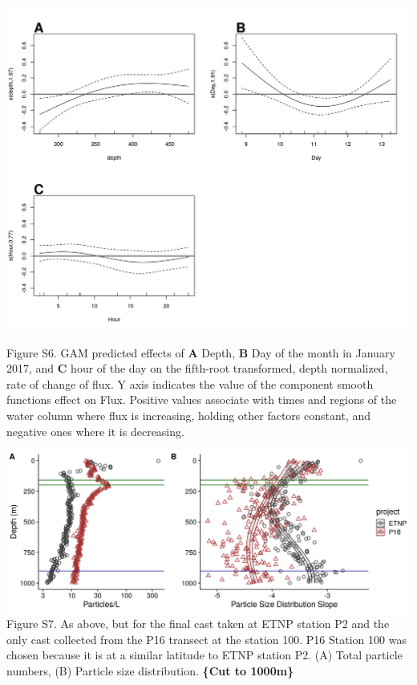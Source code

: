 \documentclass[]{article}
\begin{document}
\includegraphics{../figures/FluxGamPlot.png}

Figure S6. GAM predicted effects of \textbf{A} Depth, \textbf{B} Day of
the month in January 2017, and \textbf{C} hour of the day on the
fifth-root transformed, depth normalized, rate of change of flux. Y axis
indicates the value of the component smooth functions effect on Flux.
Positive values associate with times and regions of the water column
where flux is increasing, holding other factors constant, and negative
ones where it is decreasing.

\includegraphics{../figures/ParticlesAndPSD_ETNPVsP16.png} Figure S7. As
above, but for the final cast taken at ETNP station P2 and the only cast
collected from the P16 transect at the station 100. P16 Station 100 was
chosen because it is at a similar latitude to ETNP station P2. (A) Total
particle numbers, (B) Particle size distribution. \textbf{\{Cut to
1000m\}}
\end{document}
